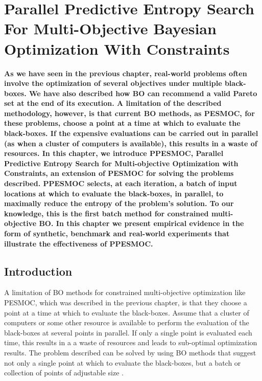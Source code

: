 
\chapter{Parallel Predictive Entropy Search For Multi-Objective Bayesian Optimization With Constraints} %
\label{Chapter5}

{\bf \small{
As we have seen in the previous chapter, real-world problems often involve the optimization of several 
objectives under multiple black-boxes. We have also described how BO can recommend a valid Pareto set
at the end of its execution. A limitation of the described methodology, however, 
is that current BO methods, as PESMOC, for these problems, choose a point at a time 
at which to evaluate the black-boxes. If the expensive evaluations can 
be carried out in parallel (as when a cluster of computers is available), this 
results in a waste of resources. In this chapter, we introduce PPESMOC, 
Parallel Predictive Entropy Search for Multi-objective Optimization 
with Constraints, an extension of PESMOC for solving the problems 
described. PPESMOC selects, at each iteration, a batch of input locations at 
which to evaluate the black-boxes, in parallel, to maximally 
reduce the entropy of the problem's solution. To our knowledge, this is 
the first batch method for constrained multi-objective BO. In this chapter we present 
empirical evidence in the form of synthetic, benchmark and real-world experiments 
that illustrate the effectiveness of PPESMOC.  }}

\section{Introduction}
A limitation of BO methods for constrained multi-objective optimization 
like PESMOC, which was described in the previous chapter, is that they choose a point at a time at which to evaluate the black-boxes. 
Assume that a cluster of computers or some other resource is available to perform the evaluation of the black-boxes at
several points in parallel. If only a single point is evaluated each time, this results in a
a waste of resources and leads to sub-optimal optimization results. The problem described can be
solved by using BO methods that suggest not only a single point at which to evaluate the 
black-boxes, but a batch or collection of points of adjustable size 
\citep{azimi2012hybrid,bergstra2011algorithms,gonzalez2016batch,shah2015parallel}.

